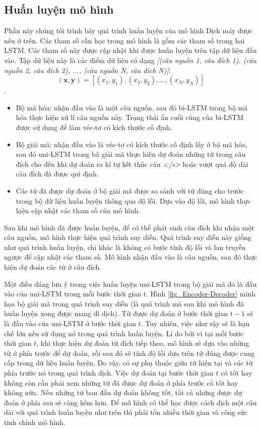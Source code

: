 \subsection{Huấn luyện mô hình}
Phần này chúng tôi trình bày quá trình huấn luyện của mô hình Dịch máy được nêu ở trên. Các tham số cần học trong mô hình là gồm các tham số trong hai LSTM. Các tham số này được cập nhật khi được huấn luyện trên tập dữ liệu đầu vào. Tập dữ liệu này là các điểm dữ liệu có dạng \textit{[(câu nguồn 1, câu đích 1), (câu nguồn 2, câu đích 2), ..., (câu nguồn N, câu đích N)]}: $$(\bm{x}, \bm{y}) = [(x_1, y_1), (x_2, y_2), ..., (x_N, y_N)]$$.
\begin{itemize}
	\item Bộ mã hóa: nhận đầu vào là một câu nguồn, sau đó bi-LSTM trong bộ mã hóa thực hiện xử lí câu nguồn này. Trạng thái ẩn cuối cùng của bi-LSTM được sử dụng để làm véc-tơ có kích thước cố định.
	\item Bộ giải mã: nhận đầu vào là véc-tơ có kích thước cố định lấy ở bộ mã hóa, sau đó uni-LSTM trong bộ giải mã thực hiện dự đoán những từ trong câu đích cho đến khi dự đoán ra kí tự kết thúc câu \textit{</s>} hoặc vượt quá độ dài câu đích đã được qui định.
	\item Các từ đã được dự đoán ở bộ giải mã được so sánh với từ đúng cho trước trong bộ dữ liệu huấn luyện thông qua độ lỗi. Dựa vào độ lỗi, mô hình thực hiện cập nhật các tham số của mô hình.
\end{itemize}

Sau khi mô hình đã được huấn luyện, để có thể phát sinh câu đích khi nhận một câu nguồn, mô hình thực hiện quá trình suy diễn. Quá trình suy diễn này giống như quá trình huấn luyện, chỉ khác là không có bước tính độ lỗi và lan truyền ngược để cập nhật các tham số. Mô hình nhận đầu vào là câu nguồn, sau đó thực hiện dự đoán các từ ở câu đích.

Một điều đáng lưu ý trong việc huấn luyện uni-LSTM trong bộ giải mã đó là đầu vào của uni-LSTM trong mỗi bước thời gian $t$. Hình \ref{fig_Encoder-Decoder} minh họa bộ giải mã trong quá trình suy diễn (là quá trình mà sau khi mô hình đã huấn luyện xong được mang đi dịch). Từ được dự đoán ở bước thời gian $t-1$ sẽ là đầu vào của uni-LSTM ở bước thời gian $t$. Tuy nhiên, việc như vậy sẽ là hạn chế lớn nếu sử dụng nó trong quá trình huấn luyện. Lí do bởi vì tại mỗi bước thời gian $t$, khi thực hiện dự đoán từ đích tiếp theo, mô hình sẽ dựa vào những từ ở phía trước để dự đoán, rồi sau đó sẽ tính độ lỗi dựa trên từ đúng được cung cấp trong dữ liệu huấn luyện. Do vậy, có sự phụ thuộc giữa từ hiện tại và các từ phía trước nó trong quá trình dịch. Việc dự đoán tại bước thời gian $t$ có tốt hay không còn cần phải xem những từ đã được dự đoán ở phía trước có tốt hay không nữa. Nếu những từ ban đầu dự đoán không tốt, tất cả những được dự đoán ở phía sau sẽ càng kém hơn. Để mô hình có thể học được cách dịch một câu dài với quá trình huấn luyện như trên thì phải tốn nhiều thời gian và công sức tinh chỉnh mô hình.
 
